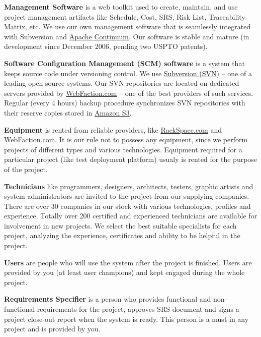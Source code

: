 \textbf{Management Software} is a web toolkit used to create, maintain, and use project management artifacts
like Schedule, Cost, SRS, Risk List, Traceability Matrix, etc. We use our own management software
that is seamlessly integrated with Subversion and \href{http://continuum.apache.org/}{Apache Continuum}.
Our software is stable and mature (in development since December 2006, pending two USPTO patents).

\textbf{Software Configuration Management (SCM) software} is a system that keeps source code 
under versioning control. We use \href{http://subversion.tigris.org/}{Subversion (SVN)} -- one of a leading open source systems. Our SVN
repositories are located on dedicated servers provided by \href{http://www.webfaction.com}{WebFaction.com} -- one of the best
providers of such services. Regular (every 4 hours) backup procedure synchronizes SVN repositories with
their reserve copies stored in \href{http://aws.amazon.com/s3/}{Amazon S3}.

\textbf{Equipment} is rented from reliable providers, like \href{http://www.rackspace.com}{RackSpace.com} and WebFaction.com.
It is our rule not to possess any equipment, since we perform projects of different types and various technologies.
Equipment required for a particular project (like test deployment platform) usualy is rented for the
purpose of the project.

\textbf{Technicians} like programmers, designers, architects, testers, graphic artists and system administrators
are invited to the project from our supplying companies. There are over 30 companies in our
stock with various technologies, profiles and experience. 
Totally over 200 certified and experienced technicians are available for involvement in new projects.
We select the best suitable specialists
for each project, analyzing the experience, certificates and ability to be helpful in the project.

\textbf{Users} are people who will use the system after the project is finished. Users are provided
by you (at least user champions) and kept engaged during the whole project.

\textbf{Requirements Specifier} is a person who provides functional and non-functional requirements
for the project, approves SRS document and signs a project close-out report when the system is ready.
This person is a must in any project and is provided by you.
